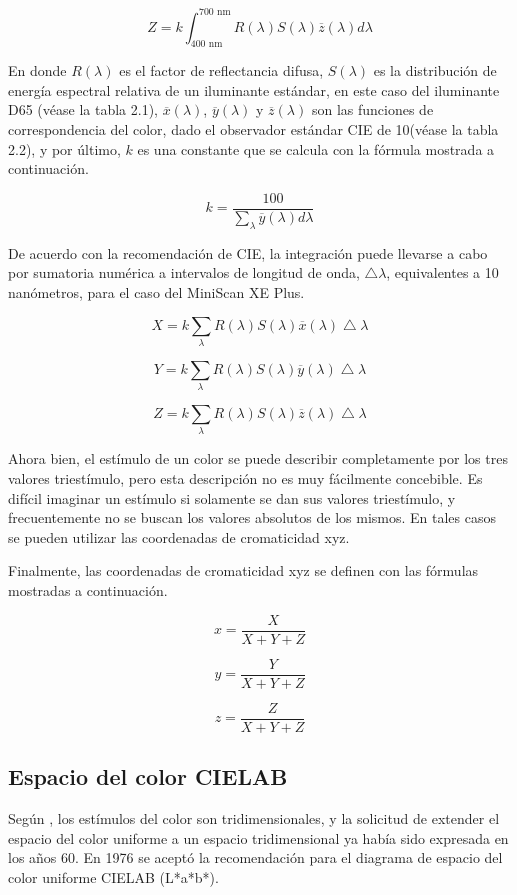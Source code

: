 		$$Z = k \int_{400 \text{ nm}}^{700 \text{ nm}} R(\lambda) S(\lambda) \overline{z}(\lambda)d\lambda$$
		
		En donde $R(\lambda)$ es el factor de reflectancia difusa, $S(\lambda)$ es la distribuci\'{o}n de energ\'{i}a espectral relativa de un iluminante est\'{a}ndar, en este caso del iluminante D65 (v\'{e}ase la tabla 2.1), $\overline{x}(\lambda)$, $\overline{y}(\lambda)$ y $\overline{z}(\lambda)$ son las funciones de correspondencia del color, dado el observador est\'{a}ndar CIE de 10\degree (v\'{e}ase la tabla 2.2), y por \'{u}ltimo, $k$ es una constante que se calcula con la f\'{o}rmula mostrada a continuaci\'{o}n.
		
		$$k = \frac{100}{\sum_{\lambda} \overline{y}(\lambda)d\lambda}$$
		
		De acuerdo con la recomendaci\'{o}n de CIE, la integraci\'{o}n puede llevarse a cabo por sumatoria num\'{e}rica a intervalos de longitud de onda, $\bigtriangleup\lambda$, equivalentes a 10 nan\'{o}metros, para el caso del MiniScan XE Plus.
		
		$$X = k \sum_{\lambda} R(\lambda) S(\lambda) \overline{x}(\lambda)\bigtriangleup\lambda$$
		
		$$Y = k \sum_{\lambda} R(\lambda) S(\lambda) \overline{y}(\lambda)\bigtriangleup\lambda$$
		
		$$Z = k \sum_{\lambda} R(\lambda) S(\lambda) \overline{z}(\lambda)\bigtriangleup\lambda$$
		
		Ahora bien, el est\'{i}mulo de un color se puede describir completamente por los tres valores triest\'{i}mulo, pero esta descripci\'{o}n no es muy f\'{a}cilmente concebible. Es dif\'{i}cil imaginar un est\'{i}mulo si solamente se dan sus valores triest\'{i}mulo, y frecuentemente no se buscan los valores absolutos de los mismos. En tales casos se pueden utilizar las coordenadas de cromaticidad xyz.
		
		Finalmente, las coordenadas de cromaticidad xyz se definen con las f\'{o}rmulas mostradas a continuaci\'{o}n.
		
		$$x = \frac{X}{X+Y+Z}$$
		
		$$y = \frac{Y}{X+Y+Z}$$
		
		$$z = \frac{Z}{X+Y+Z}$$
	
	\subsection{Espacio del color CIELAB}
	
		Seg\'{u}n \cite{Schanda}, los est\'{i}mulos del color son tridimensionales, y la solicitud de extender el espacio del color uniforme a un espacio tridimensional ya hab\'{i}a sido expresada en los a\~{n}os 60. En 1976 se acept\'{o} la recomendaci\'{o}n para el diagrama de espacio del color uniforme CIELAB (L*a*b*).
		
